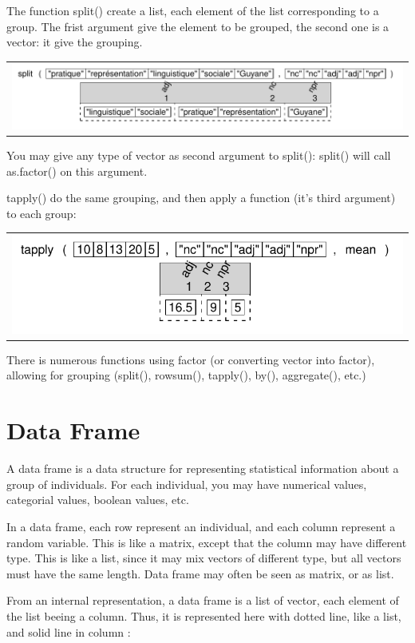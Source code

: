 \documentclass[pdflatex]{article}
\begin{document}
The function split() create a list, each element
of the list corresponding to a group. The frist argument give the element to be
grouped, the second one is a vector: it give the grouping.

\begin{tabular}{c}
\includegraphics{split2}
\end{tabular}

You may give any type of vector as second argument to split(): split() will
call as.factor() on this argument.

tapply() do the same grouping, and then apply a function (it's third argument)
to each group:

\begin{tabular}{c}
\includegraphics{tapply}
\end{tabular}

There is numerous functions using factor (or converting vector into factor),
allowing for grouping (split(), rowsum(), tapply(), by(), aggregate(), etc.)

\section{Data Frame}

A data frame is a data structure for representing statistical information about
a group of individuals. For each individual, you may have numerical values,
categorial values, boolean values, etc.

In a data frame, each row represent an individual, and each column represent a
random variable. This is like a matrix, except that the column may have
different type. This is like a list, since it may mix vectors of different
type, but all vectors must have the same length. Data frame may often be
seen as matrix, or as list.

From an internal representation, a data frame is a list of vector, each element
of the list beeing a column. Thus, it is represented here with dotted line,
like a list, and solid line in column :
\end{document}
